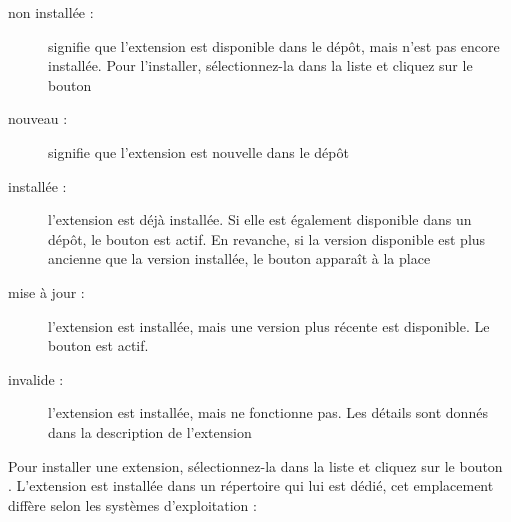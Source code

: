 \begin{description}
\item[non installée :]signifie que l'extension est disponible dans le dépôt, mais n'est pas encore installée. Pour l'installer, sélectionnez-la dans la liste et cliquez sur le bouton\\ 
\item[nouveau :] signifie que l'extension est nouvelle dans le dépôt
\item[installée :] l'extension est déjà installée. Si elle est également disponible dans un dépôt, le bouton  est actif. En revanche, si la version disponible est plus ancienne que la version installée, le bouton  apparaît à la place
\item[mise à jour :] l'extension est installée, mais une version plus récente est disponible. Le bouton  est actif.
\item[invalide :] l'extension est installée, mais ne fonctionne pas. Les détails sont donnés dans la description de l'extension
\end{description}


Pour installer une extension, sélectionnez-la dans la liste et cliquez sur le bouton\\ . L'extension est installée dans un répertoire qui lui est dédié, cet emplacement diffère selon les systèmes d'exploitation :

